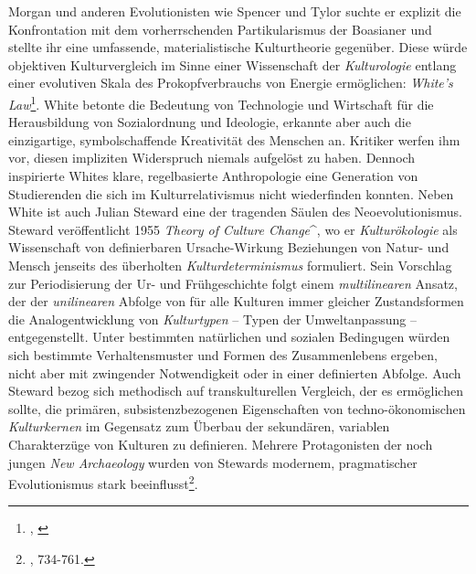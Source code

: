 \documentclass[openany,twoside,twocolumn]{book}
\let\rmarkdownfootnote\footnote%
\def\footnote{\protect\rmarkdownfootnote}
\begin{document}
Morgan und anderen Evolutionisten wie Spencer und Tylor suchte er
explizit die Konfrontation mit dem vorherrschenden Partikularismus der
Boasianer und stellte ihr eine umfassende, materialistische
Kulturtheorie gegenüber. Diese würde objektiven Kulturvergleich im Sinne
einer Wissenschaft der \emph{Kulturologie} entlang einer evolutiven
Skala des Prokopfverbrauchs von Energie ermöglichen: \emph{White's
Law}\footnote{\textcite{white_energy_1943},
  \textcite{white_science_1949}}. White betonte die Bedeutung von
Technologie und Wirtschaft für die Herausbildung von Sozialordnung und
Ideologie, erkannte aber auch die einzigartige, symbolschaffende
Kreativität des Menschen an. Kritiker werfen ihm vor, diesen impliziten
Widerspruch niemals aufgelöst zu haben. Dennoch inspirierte Whites
klare, regelbasierte Anthropologie eine Generation von Studierenden die
sich im Kulturrelativismus nicht wiederfinden konnten. Neben White ist
auch Julian Steward eine der tragenden Säulen des Neoevolutionismus.
Steward veröffentlicht 1955 \emph{Theory of Culture Change}\^{}, wo er
\emph{Kulturökologie} als Wissenschaft von definierbaren Ursache-Wirkung
Beziehungen von Natur- und Mensch jenseits des überholten
\emph{Kulturdeterminismus} formuliert. Sein Vorschlag zur Periodisierung
der Ur- und Frühgeschichte folgt einem \emph{multilinearen} Ansatz, der
der \emph{unilinearen} Abfolge von für alle Kulturen immer gleicher
Zustandsformen die Analogentwicklung von \emph{Kulturtypen} -- Typen der
Umweltanpassung -- entgegenstellt. Unter bestimmten natürlichen und
sozialen Bedingugen würden sich bestimmte Verhaltensmuster und Formen
des Zusammenlebens ergeben, nicht aber mit zwingender Notwendigkeit oder
in einer definierten Abfolge. Auch Steward bezog sich methodisch auf
transkulturellen Vergleich, der es ermöglichen sollte, die primären,
subsistenzbezogenen Eigenschaften von techno-ökonomischen
\emph{Kulturkernen} im Gegensatz zum Überbau der sekundären, variablen
Charakterzüge von Kulturen zu definieren. Mehrere Protagonisten der noch
jungen \emph{New Archaeology} wurden von Stewards modernem,
pragmatischer Evolutionismus stark beeinflusst\footnote{\textcite{petermann_geschichte_2004},
  734-761.}.
\end{document}
